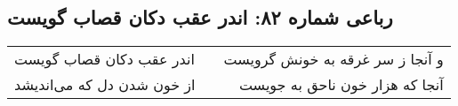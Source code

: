 \begin{center}
\section*{رباعی شماره ۸۲: اندر عقب دکان قصاب گویست}
\label{sec:sh082}
\begin{longtable}{l p{0.5cm} r}
اندر عقب دکان قصاب گویست
&&
و آنجا ز سر غرقه به خونش گرویست
\\
از خون شدن دل که می‌اندیشد
&&
آنجا که هزار خون ناحق به جویست
\\
\end{longtable}
\end{center}
